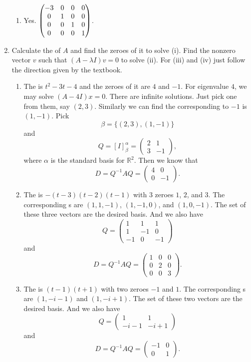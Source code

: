 \begin{enumerate}
\begin{enumerate}
\item Yes. $\begin{pmatrix}-3 & 0 & 0 & 0\cr 0 & 1 & 0 & 0\cr 0 & 0 & 1 & 0\cr 0 & 0 & 0 & 1\end{pmatrix}$.
\end{enumerate}
\item Calculate the \charpoly{} of $A$ and find the zeroes of it to solve (i). Find the nonzero vector $v$ such that $(A-\lambda I)v=0$ to solve (ii). For (iii) and (iv) just follow the direction given by the textbook.
\begin{enumerate}
\item The \charpoly{} is ${t}^{2}-3t-4$ and the zeroes of it are $4$ and $-1$. For eigenvalue $4$, we may solve $(A-4I)x=0$. There are infinite solutions. Just pick one from them, say $(2,3)$. Similarly we can find the \egve{} corresponding to $-1$ is $(1,-1)$. Pick 
\[\beta=\{(2,3),(1,-1)\}\] 
and 
\[Q=[I]_{\beta}^{\alpha}=\begin{pmatrix}2&1\\3&-1\end{pmatrix},\]
where $\alpha $ is the standard basis for $\mathbb{R}^2$. Then we know that 
\[D=Q^{-1}AQ=\begin{pmatrix}4&0\\0&-1\end{pmatrix}.\]
\item The \charpoly{} is $-\left( t-3\right) \left( t-2\right) \left( t-1\right) $ with $3$ zeroes $1$, $2$, and $3$. The corresponding \egve s are $(1,1,-1)$, $(1,-1,0)$, and $(1,0,-1)$. The set of these three vectors are the desired basis. And we also have 
\[Q=\begin{pmatrix}1&1&1\\1&-1&0\\-1&0&-1\end{pmatrix}\]
and 
\[D=Q^{-1}AQ=\begin{pmatrix}1&0&0\\0&2&0\\0&0&3\end{pmatrix}.\]
\item The \charpoly{} is $\left( t-1\right) \left( t+1\right) $ with two zeroes $-1$ and $1$. The corresponding \egve s are $(1,-i-1)$ and $(1,-i+1)$. The set of these two vectors are the desired basis. And we also have 
\[Q=\begin{pmatrix}1&1\\-i-1&-i+1\end{pmatrix}\]
and 
\[D=Q^{-1}AQ=\begin{pmatrix}-1&0\\0&1\end{pmatrix}.\]

\end{enumerate}
\end{enumerate}
